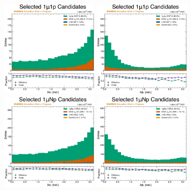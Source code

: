 \begin{figure}[!htb]
    \centering
    \includegraphics[width=0.42\textwidth]{figures/neutrino_selection/selected_hist1d_1mu1p_delta_alphaT.pdf}
    \includegraphics[width=0.42\textwidth]{figures/neutrino_selection/selected_hist1d_1mu1p_delta_phiT.pdf}
    \\
    \includegraphics[width=0.42\textwidth]{figures/neutrino_selection/selected_hist1d_1muNp_delta_alphaT.pdf}
    \includegraphics[width=0.42\textwidth]{figures/neutrino_selection/selected_hist1d_1muNp_delta_phiT.pdf}

\end{figure}
